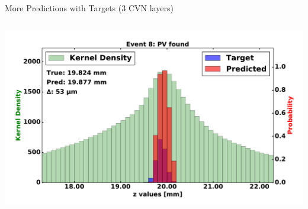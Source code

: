 \begin{frame}{More Predictions with Targets (3 CVN layers)}
\begin{columns}[c]
\begin{center}
           \includegraphics[width=1\textwidth, height=0.45\textwidth, trim=18 0 18 0]{images/120000_3layer_48.pdf}
       \end{center}
  \end{columns}
\end{frame}

